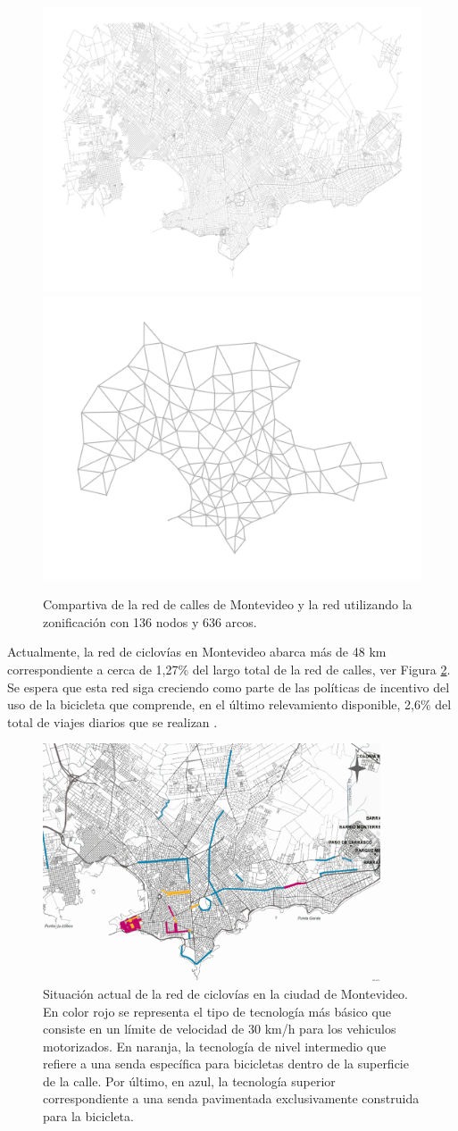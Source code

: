 \begin{figure}[h!]
  \centering
  \includegraphics[width=.49\linewidth]{../resources/montevideo_full.png}
  \includegraphics[width=.49\linewidth]{../resources/montevideo_simple.png}
  \caption{Compartiva de la red de calles de Montevideo y la red utilizando la zonificación con 136 nodos y 636 arcos.}
  \label{fig:montevideosimplification}
\end{figure}

Actualmente, la red de ciclovías en Montevideo abarca más de 48 km correspondiente a cerca de 1,27\% del largo total de la red de calles, ver Figura \ref{fig:montevideobikeways}. Se espera que esta red siga creciendo como parte de las políticas de incentivo del uso de la bicicleta que comprende, en el último relevamiento disponible, 2,6\% del total de viajes diarios que se realizan \parencite{Mauttone2017a}.

\begin{figure}[h!]
  \centering
  \includegraphics[width=10cm]{../resources/bicicircuitos_montevideo.png}
  \caption{Situación actual de la red de ciclovías en la ciudad de Montevideo. En color rojo se representa el tipo de tecnología más básico que consiste en un límite de velocidad de 30 km/h para los vehiculos motorizados. En naranja, la tecnología de nivel intermedio que refiere a una senda específica para bicicletas dentro de la superficie de la calle. Por último, en azul, la tecnología superior correspondiente a una senda pavimentada exclusivamente construida para la bicicleta.}
  \label{fig:montevideobikeways}
\end{figure}


